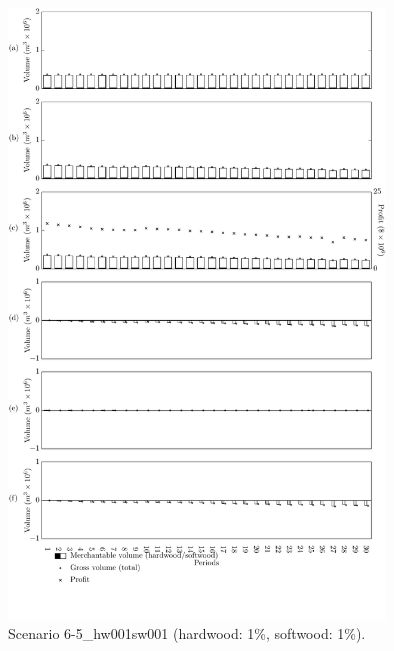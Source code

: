 \begin{figure}[h]
  \centering
  \includegraphics[width=10cm]{images/appendix/s6-5_hw001sw001}
  \caption{Scenario 6-5\_hw001sw001 (hardwood: 1\%, softwood: 1\%).}
  \label{fig:s6-5_hw001sw001}
\end{figure}

